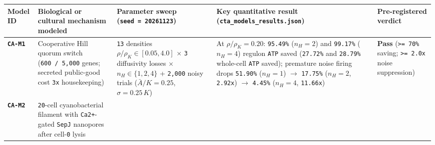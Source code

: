 \documentclass[10pt,letterpaper]{article}
\begin{document}
{\footnotesize\setlength{\tabcolsep}{3.8pt}\renewcommand{\arraystretch}{1.15}
\begin{longtable}[]{@{}
  >{\raggedright\arraybackslash}p{}
  >{\raggedright\arraybackslash}p{}
  >{\raggedright\arraybackslash}p{}
  >{\raggedright\arraybackslash}p{}
  >{\raggedright\arraybackslash}p{}@{}}
\toprule\noalign{}
\begin{minipage}[b]{\linewidth}\raggedright
\textbf{Model ID}
\end{minipage} & \begin{minipage}[b]{\linewidth}\raggedright
\textbf{Biological or cultural mechanism modeled}
\end{minipage} & \begin{minipage}[b]{\linewidth}\raggedright
\textbf{Parameter sweep (\texttt{seed\ =\ 20261123})}
\end{minipage} & \begin{minipage}[b]{\linewidth}\raggedright
\textbf{Key quantitative result (\texttt{cta\_\allowbreak{}models\_\allowbreak{}results.\allowbreak{}json})}
\end{minipage} & \begin{minipage}[b]{\linewidth}\raggedright
\textbf{Pre-registered verdict}
\end{minipage} \\
\midrule\noalign{}
\endhead
\bottomrule\noalign{}
\endlastfoot
\textbf{\texttt{CA-M1}} & Cooperative Hill quorum switch
(\texttt{600\ /\allowbreak{}\ 5,\allowbreak{}000} genes; secreted public-good cost \texttt{3x}
housekeeping) & \texttt{13} densities \(\rho/\rho_K \in [0.05, 4.0]\)
\(\times\) \texttt{3} diffusivity losses \(\times\)
\(n_H \in \{1, 2, 4\}\) + \texttt{2,000} noisy trials
(\(\bar{A}/K = 0.25\), \(\sigma = 0.25\,K\)) & At
\(\rho/\rho_K = 0.20\): \texttt{95.49\%} (\(n_H = 2\)) and
\texttt{99.17\%} (\(n_H = 4\)) regulon \texttt{ATP} saved
(\texttt{27.72\%} and \texttt{28.79\%} whole-cell \texttt{ATP} saved);
premature noise firing drops \texttt{51.90\%} (\(n_H=1\)) \(\to\)
\texttt{17.75\%} (\(n_H=2\), \texttt{2.92x}) \(\to\) \texttt{4.45\%}
(\(n_H=4\), \texttt{11.66x}) & \textbf{Pass}
(\texttt{\textgreater{}=\ 70\%} saving; \texttt{\textgreater{}=\ 2.0x}
noise suppression) \\
\textbf{\texttt{CA-M2}} & \texttt{20}-cell cyanobacterial filament with
\texttt{Ca2+}-gated \texttt{SepJ} nanopores after cell-\texttt{0} lysis

\end{longtable}}
\end{document}
